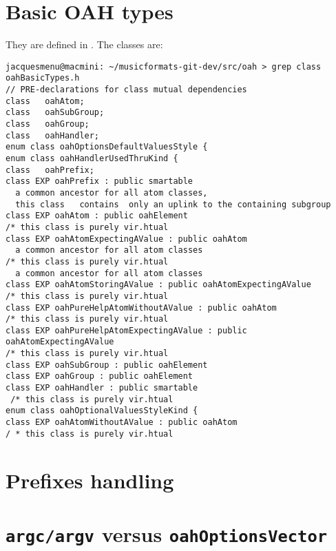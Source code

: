 \section{Basic OAH types}

They are defined in . The classes are:
\begin{lstlisting}[language=Terminal]
jacquesmenu@macmini: ~/musicformats-git-dev/src/oah > grep class   oahBasicTypes.h
// PRE-declarations for class mutual dependencies
class   oahAtom;
class   oahSubGroup;
class   oahGroup;
class   oahHandler;
enum class oahOptionsDefaultValuesStyle {
enum class oahHandlerUsedThruKind {
class   oahPrefix;
class EXP oahPrefix : public smartable
  a common ancestor for all atom classes,
  this class   contains  only an uplink to the containing subgroup
class EXP oahAtom : public oahElement
/* this class is purely vir.htual
class EXP oahAtomExpectingAValue : public oahAtom
  a common ancestor for all atom classes
/* this class is purely vir.htual
  a common ancestor for all atom classes
class EXP oahAtomStoringAValue : public oahAtomExpectingAValue
/* this class is purely vir.htual
class EXP oahPureHelpAtomWithoutAValue : public oahAtom
/* this class is purely vir.htual
class EXP oahPureHelpAtomExpectingAValue : public oahAtomExpectingAValue
/* this class is purely vir.htual
class EXP oahSubGroup : public oahElement
class EXP oahGroup : public oahElement
class EXP oahHandler : public smartable
 /* this class is purely vir.htual
enum class oahOptionalValuesStyleKind {
class EXP oahAtomWithoutAValue : public oahAtom
/ * this class is purely vir.htual
\end{lstlisting}


\section{Prefixes handling}


\section{{\tt argc/argv} versus {\tt oahOptionsVector}}

